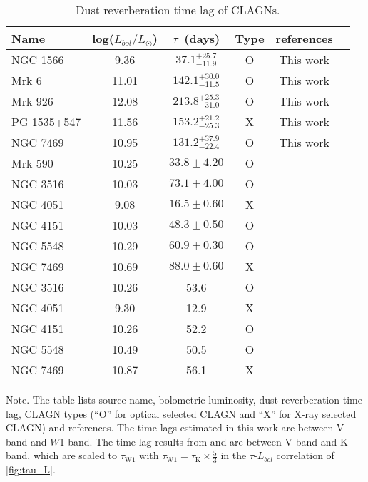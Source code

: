 \begin{table}
 \caption{Dust reverberation time lag of CLAGNs.
}
 \label{table_lag}
 \begin{center}
 \begin{tabular}{lccccc}
 \hline\hline
Name & log($L_{bol}/L_{\odot}$) & $\tau$~(days) &Type  & references\\ \hline 
NGC 1566 & 9.36 & $37.1^{+25.7}_{-11.9}$ & O & This work \\
Mrk 6 & 11.01 & $142.1^{+30.0}_{-11.5}$ & O & This work \\
Mrk 926 & 12.08 & $213.8^{+25.3}_{-31.0}$ & O & This work \\
PG 1535+547 & 11.56 & $153.2^{+21.2}_{-25.3}$ & X & This work \\
NGC 7469 & 10.95 & $131.2^{+37.9}_{-22.4}$ & O & This work \\
Mrk 590 & 10.25 & $ 33.8 \pm 4.20$ & O & \citet{2014ApJ...788..159K} \\
NGC 3516 & 10.03 & $ 73.1 \pm 4.00$ & O & \citet{2014ApJ...788..159K} \\
NGC 4051 & 9.08 & $ 16.5 \pm 0.60$ & X & \citet{2014ApJ...788..159K} \\
NGC 4151 & 10.03 & $ 48.3 \pm 0.50$ & O & \citet{2014ApJ...788..159K} \\
NGC 5548 & 10.29 & $ 60.9 \pm 0.30$ & O & \citet{2014ApJ...788..159K} \\
NGC 7469 & 10.69 & $ 88.0 \pm 0.60$ & X & \citet{2014ApJ...788..159K} \\
NGC 3516 & 10.26 & 53.6 & O & \citet{2019ApJ...886...33L} \\
NGC 4051 & 9.30 & 12.9 & X & \citet{2019ApJ...886...33L} \\
NGC 4151 & 10.26 & 52.2 & O & \citet{2019ApJ...886...33L} \\
NGC 5548 & 10.49 & 50.5 & O & \citet{2019ApJ...886...33L} \\
NGC 7469 & 10.87 & 56.1 & X & \citet{2019ApJ...886...33L} \\
\hline\hline
\end{tabular}
\end{center}
Note. The table lists source name, bolometric luminosity, dust reverberation time lag, CLAGN types (``O'' for optical selected CLAGN and ``X'' for X-ray selected CLAGN) and references. The time lags estimated in this work are between V band and $W$1 band. The time lag results from \citet{2014ApJ...788..159K} and \citet{2019ApJ...886...33L} are between V band and K band, which are scaled to $\tau_\mathrm{W1}$ with $\tau_\mathrm{W1}=\tau_\mathrm{K} \times \frac{5}{3}$ in the $\tau$-$L_{bol}$ correlation of \autoref{fig:tau_L}. 
\end{table}

